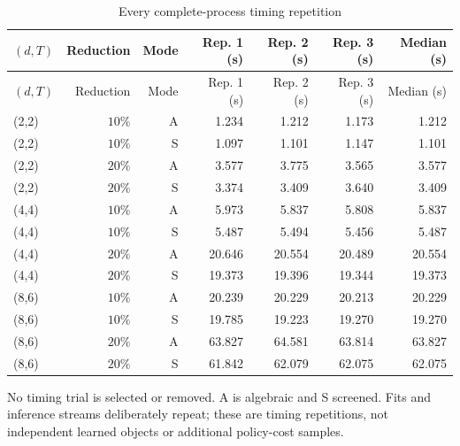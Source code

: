 \begingroup\footnotesize\setlength{\tabcolsep}{3pt}
\begin{longtable}{lrrrrrr}
\caption{Every complete-process timing repetition}\label{tab:repetitions59}\\
\hline
$(d,T)$ & Reduction & Mode & Rep. 1 (s) & Rep. 2 (s) & Rep. 3 (s) & Median (s) \\
\hline
\endfirsthead
$(d,T)$ & Reduction & Mode & Rep. 1 (s) & Rep. 2 (s) & Rep. 3 (s) & Median (s) \\
\hline
\endhead
(2,2) & $10\%$ & A & 1.234 & 1.212 & 1.173 & 1.212 \\
(2,2) & $10\%$ & S & 1.097 & 1.101 & 1.147 & 1.101 \\
(2,2) & $20\%$ & A & 3.577 & 3.775 & 3.565 & 3.577 \\
(2,2) & $20\%$ & S & 3.374 & 3.409 & 3.640 & 3.409 \\
(4,4) & $10\%$ & A & 5.973 & 5.837 & 5.808 & 5.837 \\
(4,4) & $10\%$ & S & 5.487 & 5.494 & 5.456 & 5.487 \\
(4,4) & $20\%$ & A & 20.646 & 20.554 & 20.489 & 20.554 \\
(4,4) & $20\%$ & S & 19.373 & 19.396 & 19.344 & 19.373 \\
(8,6) & $10\%$ & A & 20.239 & 20.229 & 20.213 & 20.229 \\
(8,6) & $10\%$ & S & 19.785 & 19.223 & 19.270 & 19.270 \\
(8,6) & $20\%$ & A & 63.827 & 64.581 & 63.814 & 63.827 \\
(8,6) & $20\%$ & S & 61.842 & 62.079 & 62.075 & 62.075 \\
\hline\end{longtable}
\noindent No timing trial is selected or removed. A is algebraic and S screened. Fits and inference streams deliberately repeat; these are timing repetitions, not independent learned objects or additional policy-cost samples.
\endgroup
